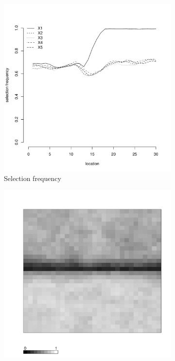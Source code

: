 \documentclass[authoryear, review, 11pt]{elsarticle}
\begin{document}
\begin{figure}
\begin{subfigure}[b]{0.45\textwidth}
		\includegraphics[width=\textwidth]{../../figures/simulation/15.11.profile_selection.pdf}
		\caption{Selection frequency}
	\end{subfigure}
	\begin{subfigure}[b]{0.45\textwidth}
	\centering
		\includegraphics[width=\textwidth]{../../figures/simulation/X1.15.11.unshrunk_bootstrap_coverage.pdf}

\end{subfigure}
\end{figure}
\end{document}
